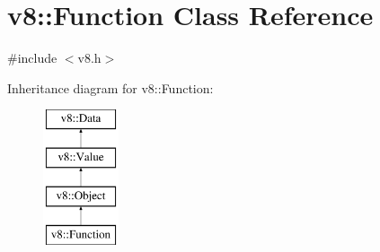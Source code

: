 \hypertarget{classv8_1_1Function}{\section{v8\-:\-:Function Class Reference}
\label{classv8_1_1Function}
}


{\ttfamily \#include $<$v8.\-h$>$}

Inheritance diagram for v8\-:\-:Function\-:\begin{figure}[H]
\begin{center}
\leavevmode
\includegraphics[height=4.000000cm]{classv8_1_1Function}
\end{center}
\end{figure}
